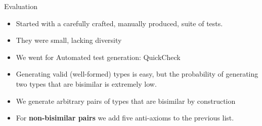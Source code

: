 \documentclass[10pt]{beamer}
\begin{document}

\begin{frame}{Evaluation}
  \begin{itemize}
  \item Started with a carefully crafted, manually produced, suite of tests.
  \item They were small, lacking diversity
  \item We went for Automated test generation: QuickCheck
  \item Generating valid (well-formed) types is easy, but the probability of
    generating two types that are bisimilar is extremely low.
  \item We generate arbitrary pairs of types that are bisimilar
    by construction %
  \item For \textbf{non-bisimilar pairs} we add five anti-axioms to the previous list.
  \end{itemize}
     
\end{frame}
\end{document}
